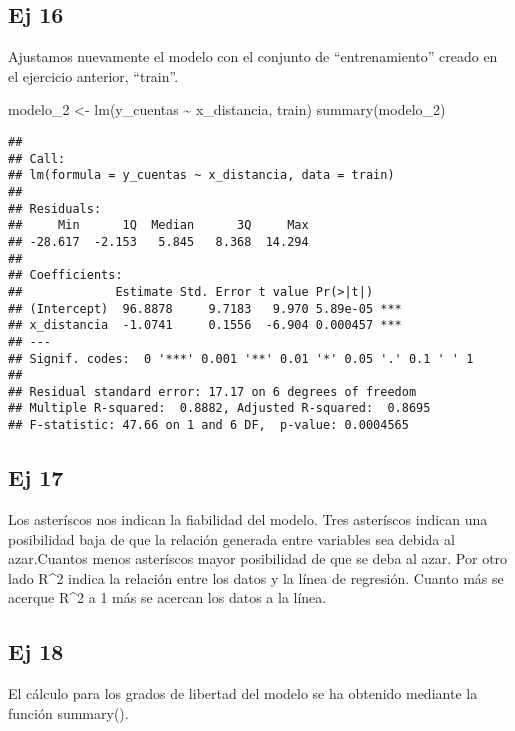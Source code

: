 \documentclass[
]{article}
\newenvironment{Shaded}{\begin{snugshade}}{\end{snugshade}}
\newcommand{\FunctionTok}[1]{\textcolor[rgb]{0.00,0.00,0.00}{#1}}
\newcommand{\NormalTok}[1]{#1}
\newcommand{\OtherTok}[1]{\textcolor[rgb]{0.56,0.35,0.01}{#1}}
\newcommand{\SpecialCharTok}[1]{\textcolor[rgb]{0.00,0.00,0.00}{#1}}
\begin{document}
\hypertarget{ej-16}{%
\subsection{Ej 16}\label{ej-16}}

Ajustamos nuevamente el modelo con el conjunto de ``entrenamiento''
creado en el ejercicio anterior, ``train''.

\begin{Shaded}
\begin{Highlighting}[]
\NormalTok{modelo\_2 }\OtherTok{\textless{}{-}} \FunctionTok{lm}\NormalTok{(y\_cuentas }\SpecialCharTok{\textasciitilde{}}\NormalTok{ x\_distancia, train)}
\FunctionTok{summary}\NormalTok{(modelo\_2)}
\end{Highlighting}
\end{Shaded}

\begin{verbatim}
## 
## Call:
## lm(formula = y_cuentas ~ x_distancia, data = train)
## 
## Residuals:
##     Min      1Q  Median      3Q     Max 
## -28.617  -2.153   5.845   8.368  14.294 
## 
## Coefficients:
##             Estimate Std. Error t value Pr(>|t|)    
## (Intercept)  96.8878     9.7183   9.970 5.89e-05 ***
## x_distancia  -1.0741     0.1556  -6.904 0.000457 ***
## ---
## Signif. codes:  0 '***' 0.001 '**' 0.01 '*' 0.05 '.' 0.1 ' ' 1
## 
## Residual standard error: 17.17 on 6 degrees of freedom
## Multiple R-squared:  0.8882, Adjusted R-squared:  0.8695 
## F-statistic: 47.66 on 1 and 6 DF,  p-value: 0.0004565
\end{verbatim}

\hypertarget{ej-17}{%
\subsection{Ej 17}\label{ej-17}}

Los asteríscos nos indican la fiabilidad del modelo. Tres asteríscos
indican una posibilidad baja de que la relación generada entre variables
sea debida al azar.Cuantos menos asteríscos mayor posibilidad de que se
deba al azar. Por otro lado R\^{}2 indica la relación entre los datos y
la línea de regresión. Cuanto más se acerque R\^{}2 a 1 más se acercan
los datos a la línea.

\hypertarget{ej-18}{%
\subsection{Ej 18}\label{ej-18}}

El cálculo para los grados de libertad del modelo se ha obtenido
mediante la función summary().
\end{document}
